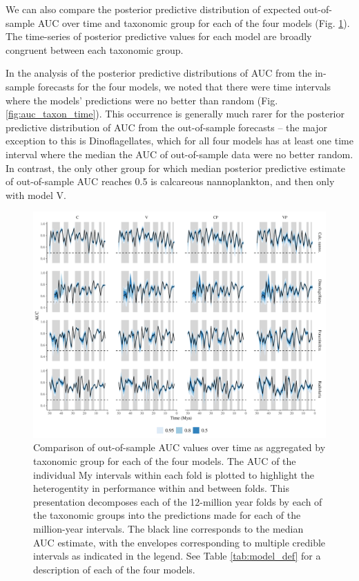 \documentclass[12pt,letterpaper]{article}
\begin{document}
\begin{refsection}
We can also compare the posterior predictive distribution of expected out-of-sample AUC over time and taxonomic group for each of the four models (Fig. \ref{fig:fold_auc_taxon_time}). The time-series of posterior predictive values for each model are broadly congruent between each taxonomic group. 

In the analysis of the posterior predictive distributions of AUC from the in-sample forecasts for the four models, we noted that there were time intervals where the models' predictions were no better than random (Fig. \ref{fig:auc_taxon_time}). This occurrence is generally much rarer for the posterior predictive distribution of AUC from the out-of-sample forecasts -- the major exception to this is Dinoflagellates, which for all four models has at least one time interval where the median the AUC of out-of-sample data were no better random. In contrast, the only other group for which median posterior predictive estimate of out-of-sample AUC reaches 0.5 is calcareous nannoplankton, and then only with model V.
\begin{figure}[ht]
  \centering
  \includegraphics[width=\textwidth,height=0.5\textheight,keepaspectratio=true]{../results/figure/fold_auc_taxon_time_full}
  \caption{Comparison of out-of-sample AUC values over time as aggregated by taxonomic group for each of the four models. The AUC of the individual My intervals within each fold is plotted to highlight the heterogentity in performance within and between folds. This presentation decomposes each of the 12-million year folds by each of the taxonomic groups into the predictions made for each of the million-year intervals. The black line corresponds to the median AUC estimate, with the envelopes corresponding to multiple credible intervals as indicated in the legend. See Table \ref{tab:model_def} for a description of each of the four models.}
  \label{fig:fold_auc_taxon_time}
\end{figure}



\end{refsection}
\end{document}
